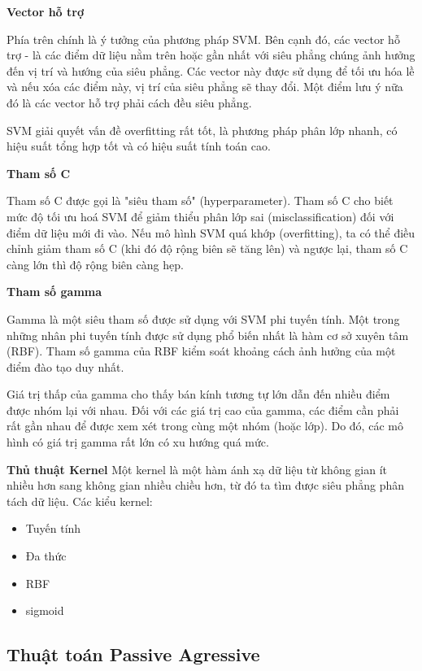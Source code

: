 \documentclass[12pt,a4paper,oneside]{book}
\begin{document}
		\textbf{Vector hỗ trợ}
		
		Phía trên chính là ý tưởng của phương pháp SVM. Bên cạnh đó, các vector hỗ trợ - là các điểm dữ liệu nằm trên hoặc gần nhất với siêu phẳng chúng ảnh hưởng đến vị trí và hướng của siêu phẳng. Các vector này được sử dụng để tối ưu hóa lề và nếu xóa các điểm này, vị trí của siêu phẳng sẽ thay đổi. Một điểm lưu ý nữa đó là các vector hỗ trợ phải cách đều siêu phẳng.
		
		SVM giải quyết vấn đề overfitting rất tốt, là phương pháp phân lớp nhanh, có hiệu suất tổng hợp tốt và có hiệu suất tính toán cao.
		
		\textbf{Tham số C}
		
		Tham số C được gọi là "siêu tham số" (hyperparameter). Tham số C cho biết mức độ tối ưu hoá SVM để giảm thiểu phân lớp sai (misclassification) đối với điểm dữ liệu mới đi vào. Nếu mô hình SVM quá khớp (overfitting), ta có thể điều chỉnh giảm tham số C (khi đó độ rộng biên sẽ tăng lên) và ngược lại, tham số C càng lớn thì độ rộng biên càng hẹp.
		
		\textbf{Tham số gamma}
		
		Gamma là một siêu tham số được sử dụng với SVM phi tuyến tính. Một trong những nhân phi tuyến tính được sử dụng phổ biến nhất là hàm cơ sở xuyên tâm (RBF). Tham số gamma của RBF kiểm soát khoảng cách ảnh hưởng của một điểm đào tạo duy nhất.
		
		Giá trị thấp của gamma cho thấy bán kính tương tự lớn dẫn đến nhiều điểm được nhóm lại với nhau. Đối với các giá trị cao của gamma, các điểm cần phải rất gần nhau để được xem xét trong cùng một nhóm (hoặc lớp). Do đó, các mô hình có giá trị gamma rất lớn có xu hướng quá mức.
		
		\textbf{Thủ thuật Kernel}
		Một kernel là một hàm ánh xạ dữ liệu từ không gian ít nhiều hơn sang không gian nhiều chiều hơn, từ đó ta tìm được siêu phẳng phân tách dữ liệu. Các kiểu kernel:
		\begin{itemize}
			\item Tuyến tính
			\item Đa thức
			\item RBF
			\item sigmoid
		\end{itemize}
		
		
		
		\subsection{Thuật toán Passive Agressive}
		
\end{document}
